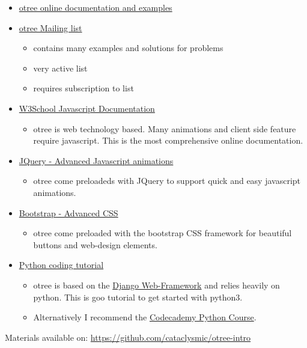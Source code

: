 \documentclass[11pt]{article}
\begin{document}
\begin{itemize}
\item \href{http://otree.readthedocs.io}{otree online documentation and examples}
\item \href{https://groups.google.com/forum/#!forum/otree}{otree Mailing list}
\begin{itemize}
\item contains many examples and solutions for problems
\item very active list
\item requires subscription to list
\end{itemize}
\item \href{http://www.w3schools.com/js/}{W3School Javascript Documentation}
\begin{itemize}
\item otree is web technology based. Many animations and client side feature require javascript. This is the most comprehensive online documentation.
\end{itemize}
\item \href{http://jquery.com/}{JQuery - Advanced Javascript animations}
\begin{itemize}
\item otree come preloadeds with JQuery to support quick and easy javascript animations.
\end{itemize}
\item \href{http://www.w3schools.com/bootstrap/}{Bootstrap - Advanced CSS}
\begin{itemize}
\item otree come preloaded with the bootstrap CSS framework for beautiful buttons and web-design elements.
\end{itemize}
\item \href{http://www.learnpython.org/}{Python coding tutorial}
\begin{itemize}
\item otree is based on the \href{https://www.djangoproject.com/}{Django Web-Framework} and relies heavily on python. This is goo tutorial to get started with python3.
\item Alternatively I recommend the \href{https://www.codecademy.com/}{Codecademy Python Course}.
\end{itemize}
\end{itemize}



\vfill
Materials available on: \url{https://github.com/cataclysmic/otree-intro}
\end{document}
